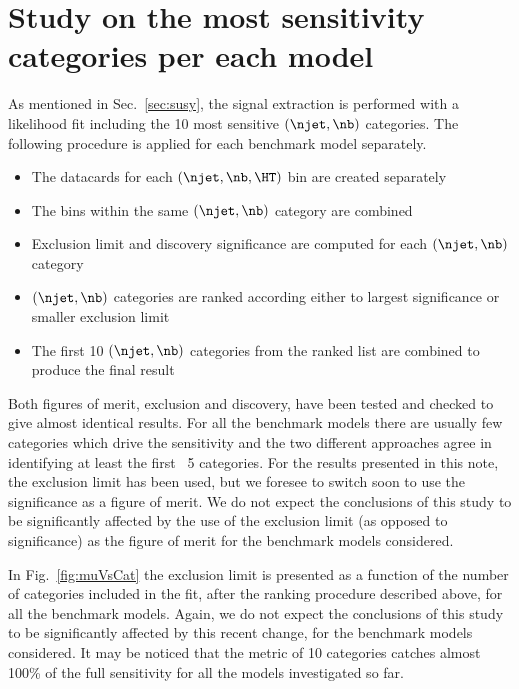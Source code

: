 \section{Study on the most sensitivity categories per each model}
\label{sec:sensitivity-study}
As mentioned in Sec.~\ref{sec:susy}, the signal extraction is performed with a likelihood fit including the 
10 most sensitive $(\njet,\nb)$ categories. 
The following procedure is applied for each benchmark model separately.

\begin{itemize}
\item The datacards for each $(\njet,\nb,\HT)$ bin are created separately
\item The \HT bins within the same $(\njet,\nb)$ category are combined
\item Exclusion limit and discovery significance are computed for each $(\njet,\nb)$ category
\item $(\njet,\nb)$ categories are ranked according either to largest significance or smaller exclusion limit
\item The first 10 $(\njet,\nb)$ categories from the ranked list are combined to produce the final result
\end{itemize}

Both figures of merit, exclusion and discovery, have been tested and checked to give almost identical results. 
For all the benchmark models there are usually few categories which drive the sensitivity 
and the two different approaches agree in identifying at least the first ~5 categories. 
For the results presented in this note, the exclusion limit has been used, but we foresee to switch soon 
to use the significance as a figure of merit. 
We do not expect the conclusions of this study to be significantly
affected by the use of the exclusion limit (as opposed to
significance) as the figure of merit for the benchmark models
considered.

In Fig.~\ref{fig:muVsCat} the exclusion limit is presented as a function of the number of categories 
included in the fit, after the ranking procedure described above, for all the benchmark models. 
Again, we do
not expect the conclusions of this study to be significantly affected
by this recent change, for the benchmark models considered. 
It may be noticed that the metric of 10 categories catches almost 100\% of the full sensitivity 
for all the models investigated so far.

